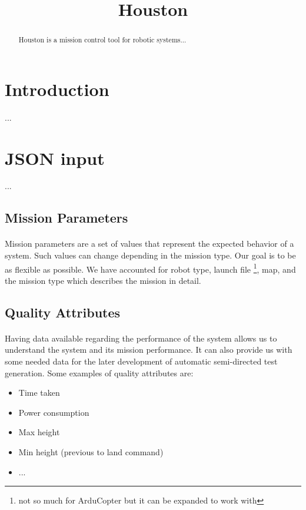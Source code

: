 \documentclass[11pt, a4paper]{article}
\title{Houston}
\begin{document}
\maketitle
	
	
\begin{abstract}
Houston is a mission control tool for robotic systems... 
\end{abstract}
	
	
\section{Introduction}
...
\section{JSON input}
...
\subsection{Mission Parameters}
\paragraph{}
Mission parameters are a set of values that represent the expected behavior of a system. Such values can change depending in the mission type. Our goal is to be as flexible as possible. We have accounted for robot type, launch file \footnote{not so much for ArduCopter but it can be expanded to work with}, map, and the mission type which describes the mission in detail.

\subsection{Quality Attributes}
\paragraph{}
Having data available regarding the performance of the system allows us to understand the system and its mission performance. It can also provide us with some needed data for the later development of automatic semi-directed test generation. Some examples of quality attributes are:
\begin{itemize}
	\itemsep-.5em
	\item Time taken
	\item Power consumption 
	\item Max height 
	\item Min height (previous to land command)
	\item ...		
\end{itemize}
\end{document}
